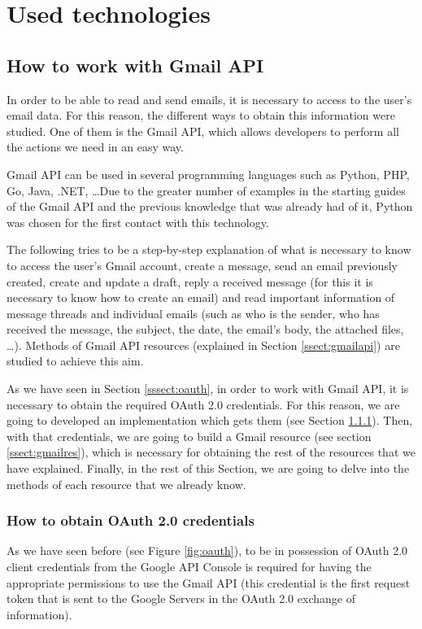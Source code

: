 \chapter{Used technologies}
\label{cap:usedtech}

\section{How to work with Gmail API}\label{sect:gmailapitech}
In order to be able to read and send emails, it is necessary to access to the user's email data. For this reason, the different ways to obtain this information were studied. One of them is the Gmail API, which allows developers to perform all the actions we need in an easy way.

Gmail API can be used in several programming languages such as Python, PHP, Go, Java, .NET, \ldots\phantom{ }Due to the greater number of examples in the starting guides of the Gmail API \citep{gmailAPI} and the previous knowledge that was already had of it, Python was chosen for the first contact with this technology.

The following tries to be a step-by-step explanation of what is necessary to know to access the user's Gmail account, create a message, send an email previously created, create and update a draft, reply a received message (for this it is necessary to know how to create an email) and read important information of message threads and individual emails (such as who is the sender, who has received the message, the subject, the date, the email's body, the attached files, \ldots). Methods of Gmail API resources (explained in Section \ref{ssect:gmailapi}) are studied to achieve this aim.

As we have seen in Section \ref{sssect:oauth}, in order to work with Gmail API, it is necessary to obtain the required OAuth 2.0 credentials. For this reason, we are going to developed an implementation which gets them (see Section \ref{ssect:oauth}). Then, with that credentials, we are going to build a Gmail resource (see section \ref{ssect:gmailres}), which is necessary for obtaining the rest of the resources that we have explained. Finally, in the rest of this Section, we are going to delve into the methods of each resource that we already know.

\subsection{How to obtain OAuth 2.0 credentials}\label{ssect:oauth}
As we have seen before (see Figure \ref{fig:oauth}), to be in possession of OAuth 2.0 client credentials from the Google API Console is required for having the appropriate permissions to use the Gmail API (this credential is the first request token that is sent to the Google Servers in the OAuth 2.0 exchange of information).

